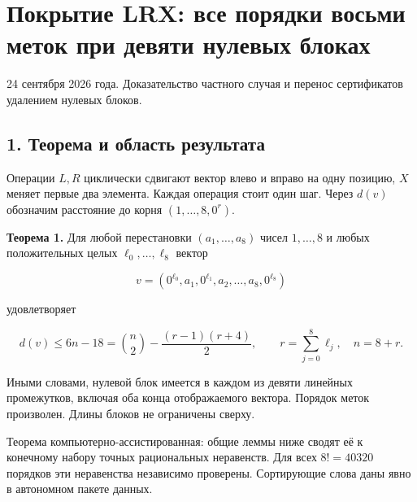 \documentclass[
  11pt,
  a4paper,
]{article}
\author{}
\date{}
\begin{document}
\hypertarget{ux43fux43eux43aux440ux44bux442ux438ux435-lrx-ux432ux441ux435-ux43fux43eux440ux44fux434ux43aux438-ux432ux43eux441ux44cux43cux438-ux43cux435ux442ux43eux43a-ux43fux440ux438-ux434ux435ux432ux44fux442ux438-ux43dux443ux43bux435ux432ux44bux445-ux431ux43bux43eux43aux430ux445}{%
\section{Покрытие LRX: все порядки восьми меток при девяти нулевых
блоках}\label{ux43fux43eux43aux440ux44bux442ux438ux435-lrx-ux432ux441ux435-ux43fux43eux440ux44fux434ux43aux438-ux432ux43eux441ux44cux43cux438-ux43cux435ux442ux43eux43a-ux43fux440ux438-ux434ux435ux432ux44fux442ux438-ux43dux443ux43bux435ux432ux44bux445-ux431ux43bux43eux43aux430ux445}}

24 сентября 2026 года. Доказательство частного случая и перенос
сертификатов удалением нулевых блоков.

\hypertarget{ux442ux435ux43eux440ux435ux43cux430-ux438-ux43eux431ux43bux430ux441ux442ux44c-ux440ux435ux437ux443ux43bux44cux442ux430ux442ux430}{%
\subsection{1. Теорема и область
результата}\label{ux442ux435ux43eux440ux435ux43cux430-ux438-ux43eux431ux43bux430ux441ux442ux44c-ux440ux435ux437ux443ux43bux44cux442ux430ux442ux430}}

Операции \(L,R\) циклически сдвигают вектор влево и вправо на одну
позицию, \(X\) меняет первые два элемента. Каждая операция стоит один
шаг. Через \(d(v)\) обозначим расстояние до корня \((1,\ldots,8,0^r)\).

\textbf{Теорема 1.} Для любой перестановки \((a_1,\ldots,a_8)\) чисел
\(1,\ldots,8\) и любых положительных целых \(\ell_0,\ldots,\ell_8\)
вектор

\[v=(0^{\ell_0},a_1,0^{\ell_1},a_2,\ldots,a_8,0^{\ell_8})\]

удовлетворяет

\[\boxed{d(v)\le6n-18
=\binom n2-\frac{(r-1)(r+4)}2,}
\qquad r=\sum_{j=0}^{8}\ell_j,\quad n=8+r.\tag{1}\]

Иными словами, нулевой блок имеется в каждом из девяти линейных
промежутков, включая оба конца отображаемого вектора. Порядок меток
произволен. Длины блоков не ограничены сверху.

Теорема компьютерно-ассистированная: общие леммы ниже сводят её к
конечному набору точных рациональных неравенств. Для всех \(8!=40320\)
порядков эти неравенства независимо проверены. Сортирующие слова даны
явно в автономном пакете данных.
\end{document}
